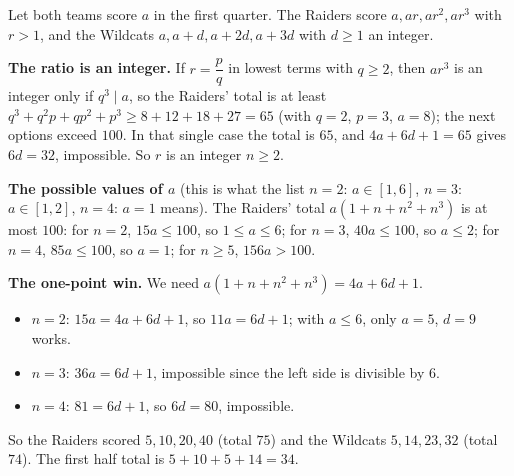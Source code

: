 Let both teams score $a$ in the first quarter. The Raiders score $a,ar,ar^2,ar^3$ with $r>1$, and the Wildcats $a,a+d,a+2d,a+3d$ with $d\ge1$ an integer.

\textbf{The ratio is an integer.} If $r=\dfrac{p}{q}$ in lowest terms with $q\ge2$, then $ar^3$ is an integer only if $q^3\mid a$, so the Raiders' total is at least $q^3+q^2p+qp^2+p^3\ge8+12+18+27=65$ (with $q=2$, $p=3$, $a=8$); the next options exceed $100$. In that single case the total is $65$, and $4a+6d+1=65$ gives $6d=32$, impossible. So $r$ is an integer $n\ge2$.

\textbf{The possible values of $a$} (this is what the list $n=2$: $a\in[1,6]$, $n=3$: $a\in[1,2]$, $n=4$: $a=1$ means). The Raiders' total $a(1+n+n^2+n^3)$ is at most $100$: for $n=2$, $15a\le100$, so $1\le a\le6$; for $n=3$, $40a\le100$, so $a\le2$; for $n=4$, $85a\le100$, so $a=1$; for $n\ge5$, $156a>100$.

\textbf{The one-point win.} We need $a(1+n+n^2+n^3)=4a+6d+1$.
\begin{itemize}
\item $n=2$: $15a=4a+6d+1$, so $11a=6d+1$; with $a\le6$, only $a=5$, $d=9$ works.
\item $n=3$: $36a=6d+1$, impossible since the left side is divisible by $6$.
\item $n=4$: $81=6d+1$, so $6d=80$, impossible.
\end{itemize}
So the Raiders scored $5,10,20,40$ (total $75$) and the Wildcats $5,14,23,32$ (total $74$). The first half total is $5+10+5+14=\boxed{34}$.

